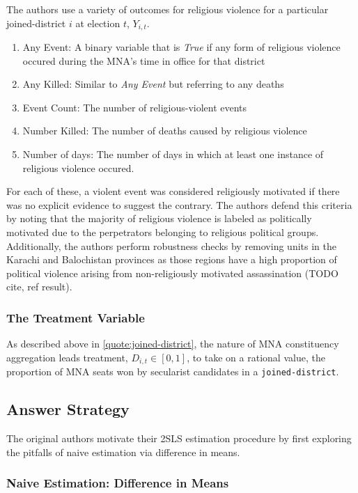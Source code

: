 \documentclass{scrartcl}
\begin{document}
The authors use a variety of outcomes for religious violence for a particular joined-district $i$ at election $t$, $Y_{i,t}$.

\begin{enumerate}
\item Any Event: A binary variable that is \textit{True} if any form of religious violence occured during the MNA's time in office for that district
\item Any Killed: Similar to \textit{Any Event} but referring to any deaths
\item Event Count: The number of religious-violent events
\item Number Killed: The number of deaths caused by religious violence
\item Number of days: The number of days in which at least one instance of religious violence occured.
\end{enumerate}

For each of these, a violent event was considered religiously motivated if there was no explicit evidence to suggest the contrary.
The authors defend this criteria by noting that the majority of religious violence is labeled as politically motivated due to the perpetrators belonging to religious political groups.
Additionally, the authors perform robustness checks by removing units in the Karachi and Balochistan provinces as those regions have a high proportion of political violence arising from non-religiously motivated assassination (TODO cite, ref result). 

\subsubsection{The Treatment Variable} \label{treatment}

As described above in \ref{quote:joined-district}, the nature of MNA constituency aggregation leads treatment, $D_{i,t} \in [0, 1]$, to take on a rational value, the proportion of MNA seats won by secularist candidates in a \texttt{joined-district}.

\subsection{Answer Strategy} \label{id}

The original authors motivate their 2SLS estimation procedure by first exploring the pitfalls of naive estimation via difference in means.

\subsubsection{Naive Estimation: Difference in Means} \label{dim}
\end{document}
